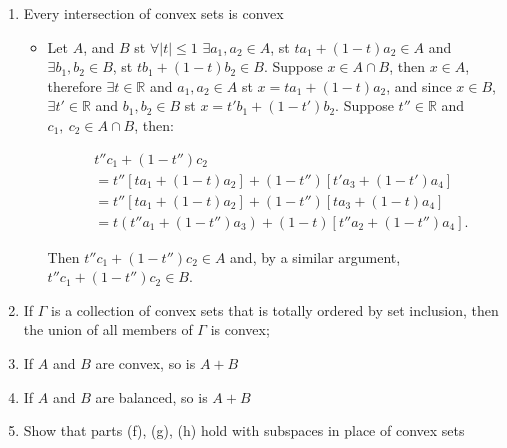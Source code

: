 \begin{enumerate}[label=(\alph*)]
    \item Every intersection of convex sets is convex
        \begin{itemize}
            \item Let $A$, and $B$ st $\forall |t|\leq 1$ $\exists a_1,a_2 \in A$, st $ta_1+(1-t)a_2\in A$ and $\exists b_1,b_2 \in B$, st $tb_1+(1-t)b_2\in B$. Suppose $x\in A\cap B$, then $x\in A$, therefore $\exists t \in\mathbb{R}$ and $a_1,a_2 \in A$ st $x=ta_1+(1-t)a_2$, and since $x\in B$, $\exists t' \in\mathbb{R}$ and $b_1,b_2 \in B$ st $x=t'b_1+(1-t')b_2$. Suppose $t'' \in \mathbb{R}$ and $c_1, \ c_2 \in A\cap B$, then:
            
            \begin{align*}
            &t''c_1+(1-t'')c_2\\
            &=t''[ta_1+(1-t)a_2]+(1-t'')[t'a_3+(1-t')a_4]\\
            &=t''[ta_1+(1-t)a_2]+(1-t'')[ta_3+(1-t)a_4]\\
            &=t(t''a_1+(1-t'')a_3)+(1-t)[t''a_2+(1-t'')a_4].
            \end{align*}

            Then $t''c_1+(1-t'')c_2 \in A$ and, by a similar argument, $t''c_1+(1-t'')c_2 \in B$.
        \end{itemize}
    \item If $\Gamma$ is a collection of convex sets that is totally ordered by set inclusion, then the union of all members of $\Gamma$ is convex;
    \item If $A$ and $B$ are convex, so is $A+B$
    \item If $A$ and $B$ are balanced, so is $A+B$
    \item Show that parts (f), (g), (h) hold with subspaces in place of convex sets
\end{enumerate}
